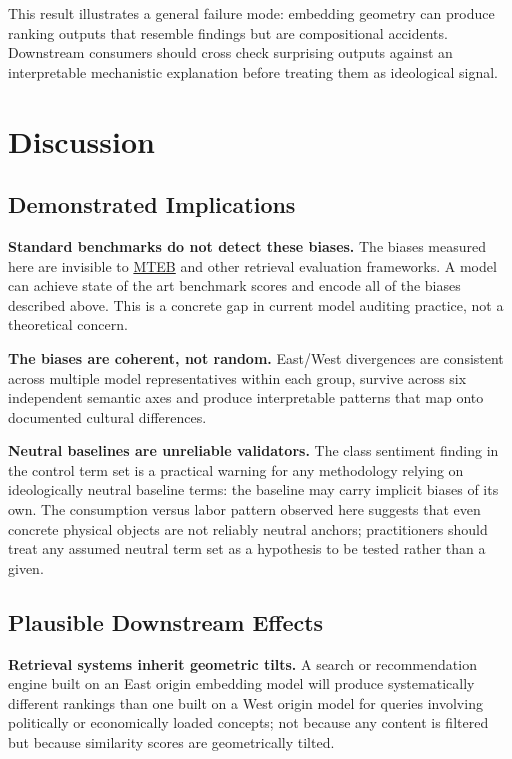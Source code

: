 \documentclass[11pt, letterpaper]{article}
\begin{document}
This result illustrates a general failure mode: embedding geometry can produce ranking outputs that resemble findings but are compositional accidents. Downstream consumers should cross check surprising outputs against an interpretable mechanistic explanation before treating them as ideological signal.

\newpage

\section{Discussion}

\subsection{Demonstrated Implications}

\textbf{Standard benchmarks do not detect these biases.} The biases measured here are invisible to \href{https://huggingface.co/spaces/mteb/leaderboard}{MTEB} and other retrieval evaluation frameworks. A model can achieve state of the art benchmark scores and encode all of the biases described above. This is a concrete gap in current model auditing practice, not a theoretical concern.

\textbf{The biases are coherent, not random.} East/West divergences are consistent across multiple model representatives within each group, survive across six independent semantic axes and produce interpretable patterns that map onto documented cultural differences.

\textbf{Neutral baselines are unreliable validators.} The class sentiment finding in the control term set is a practical warning for any methodology relying on ideologically neutral baseline terms: the baseline may carry implicit biases of its own. The consumption versus labor pattern observed here suggests that even concrete physical objects are not reliably neutral anchors; practitioners should treat any assumed neutral term set as a hypothesis to be tested rather than a given.

\subsection{Plausible Downstream Effects}

\textbf{Retrieval systems inherit geometric tilts.} A search or recommendation engine built on an East origin embedding model will produce systematically different rankings than one built on a West origin model for queries involving politically or economically loaded concepts; not because any content is filtered but because similarity scores are geometrically tilted.
\end{document}
